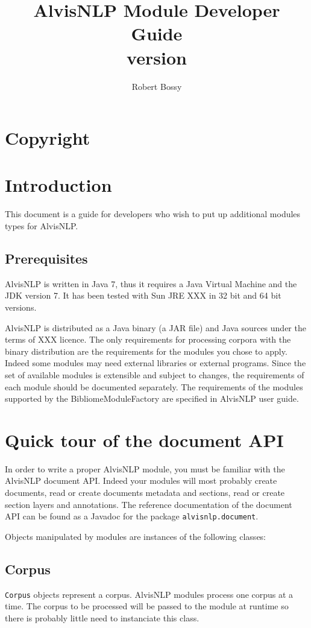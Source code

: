 \documentclass[a4paper]{article}
\title{AlvisNLP Module Developer Guide\\version \version}
\author{Robert Bossy}
\begin{document}
\maketitle
\tableofcontents

\section{Copyright}
\license

\section{Introduction}
This document is a guide for developers who wish to put up additional modules types for AlvisNLP.

\subsection{Prerequisites}
AlvisNLP is written in Java 7, thus it requires a Java Virtual Machine and the JDK version 7.
It has been tested with Sun JRE XXX in 32 bit and 64 bit versions.

AlvisNLP is distributed as a Java binary (a JAR file) and Java sources under the terms of XXX licence.
The only requirements for processing corpora with the binary distribution are the requirements for the modules you chose to apply.
Indeed some modules may need external libraries or external programs.
Since the set of available modules is extensible and subject to changes, the requirements of each module should be documented separately.
The requirements of the modules supported by the BibliomeModuleFactory are specified in AlvisNLP user guide.

\section{Quick tour of the document API}
\label{DocumentAPI}

In order to write a proper AlvisNLP module, you must be familiar with the AlvisNLP document API.
Indeed your modules will most probably create documents, read or create documents metadata and sections, read or create section layers and annotations.
The reference documentation of the document API can be found as a Javadoc for the package \texttt{alvisnlp.document}.

Objects manipulated by modules are instances of the following classes:

\subsection{Corpus}
\texttt{Corpus} objects represent a corpus.
AlvisNLP modules process one corpus at a time.
The corpus to be processed will be passed to the module at runtime so there is probably little need to instanciate this class.
\end{document}
